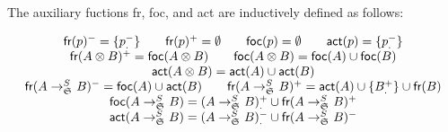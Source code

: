 \begin{definition}
  The auxiliary fuctions \textsf{fr}, \textsf{foc}, and \textsf{act} are
  inductively defined as follows:

  \[
    \begin{array}{c}
      \textsf{fr}(p)^- = \{p_.^-\} \qquad
      \textsf{fr}(p)^+ = \emptyset \qquad
      \textsf{foc}(p) = \emptyset \qquad
      \textsf{act}(p) = \{p_.^-\} \\

      \textsf{fr}(A \otimes B)^+ = \textsf{foc}(A \otimes B) \qquad
      \textsf{foc}(A \otimes B) = \textsf{foc}(A) \cup \textsf{foc}(B) \\

      \textsf{act}(A \otimes B) = \textsf{act}(A) \cup \textsf{act}(B) \\

      \textsf{fr}(A \rightarrow_{\mathfrak{S}_{}}^S B)^- =
      \textsf{foc}(A) \cup \textsf{act}(B) \qquad
      \textsf{fr}(A \rightarrow_{\mathfrak{S}_{}}^S B)^+ =
      \textsf{act}(A) \cup \{ B_.^+ \} \cup \textsf{fr}(B) \\

      \textsf{foc}(A \rightarrow_{\mathfrak{S}_{}}^S B) =
      (A \rightarrow_{\mathfrak{S}_{}}^S B)_.^+ \cup
      \textsf{fr}(A \rightarrow_{\mathfrak{S}_{}}^S B)^+ \\

      \textsf{act}(A \rightarrow_{\mathfrak{S}_{}}^S B) =
      (A \rightarrow_{\mathfrak{S}_{}}^S B)_.^- \cup
      \textsf{fr}(A \rightarrow_{\mathfrak{S}_{}}^S B)^-
    \end{array}
  \]
\end{definition}


